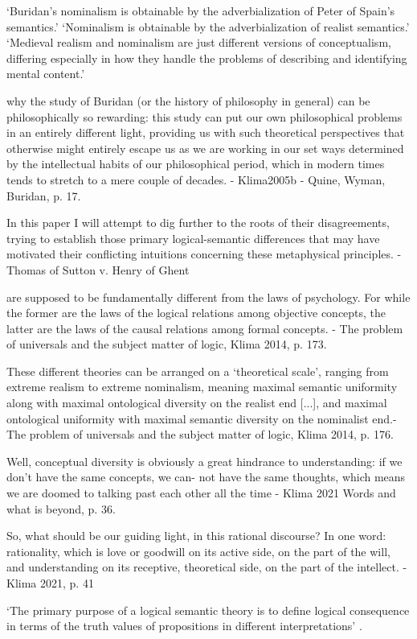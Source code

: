 \documentclass[]{article}
\begin{document}
`Buridan’s nominalism is obtainable by the adverbialization of Peter
of Spain’s semantics.'
`Nominalism is obtainable by the adverbialization of realist
semantics.'
`Medieval realism and nominalism are just different versions of conceptualism, differing especially in how they handle the problems of
describing and identifying mental content.'\autocite[110]{Klima2011}

why the study of
Buridan (or the history of philosophy in general) can be philosophically so rewarding: this
study can put our own philosophical problems in an entirely different light, providing us with
such theoretical perspectives that otherwise might entirely escape us as we are working in our
set ways determined by the intellectual habits of our philosophical period, which in modern
times tends to stretch to a mere couple of decades. - Klima2005b - Quine, Wyman, Buridan, p. 17.

In this paper I will attempt to dig further to the roots of
their disagreements, trying to establish those primary logical-semantic differences that may have
motivated their conflicting intuitions concerning these metaphysical principles. - Thomas of Sutton v. Henry of Ghent

are supposed to be fundamentally diﬀerent from the laws of psychology.
For while the former are the laws of the logical relations among objective
concepts, the latter are the laws of the causal relations among formal
concepts. - The problem of universals and the subject matter of logic, Klima 2014, p. 173.

These different theories can be arranged on a `theoretical scale', ranging from extreme realism to extreme nominalism, meaning maximal semantic uniformity along with maximal ontological diversity on the realist end [...], and maximal ontological uniformity with maximal semantic diversity on the nominalist end.- The problem of universals and the subject matter of logic, Klima 2014, p. 176.

Well, conceptual diversity is obviously
a great hindrance to understanding: if we don’t have the same concepts, we can-
not have the same thoughts, which means we are doomed to talking past each
other all the time - Klima 2021 Words and what is beyond, p. 36.

So, what should be our guiding light, in this rational discourse? In one word:
rationality, which is love or goodwill on its active side, on the part of the will, and
understanding on its receptive, theoretical side, on the part of the intellect. -Klima 2021, p. 41
\autocite{Parsons2014,Read2015b}

`The primary purpose of a logical semantic theory is to define logical consequence in terms of the truth values of propositions in different interpretations' \autocite[79]{Klima1991b}. 

\printbibliography
\end{document}
